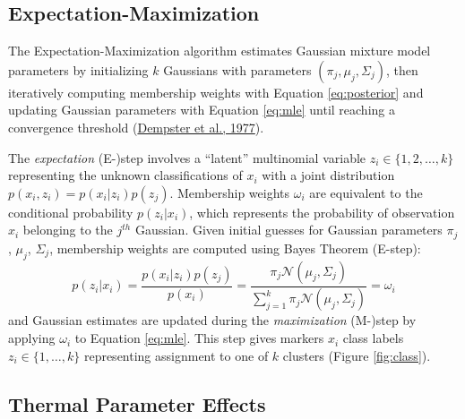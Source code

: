\hypertarget{expectation-maximization}{%
\subsection{Expectation-Maximization}\label{expectation-maximization}}

The Expectation-Maximization algorithm estimates Gaussian mixture model parameters by initializing \(k\) Gaussians with parameters \((\pi_j, \mu_j, \Sigma_j)\), then iteratively computing membership weights with Equation \eqref{eq:posterior} and updating Gaussian parameters with Equation \eqref{eq:mle} until reaching a convergence threshold (\protect\hyperlink{ref-dempster1977}{Dempster et al., 1977}).

The \emph{expectation} (E-)step involves a ``latent'' multinomial variable \(z_{i} \in \{1, 2, \dots, k\}\) representing the unknown classifications of \(x_i\) with a joint distribution \(p(x_i,z_{i}) = p(x_i | z_{i})p(z_{j})\). Membership weights \(\omega_{i}\) are equivalent to the conditional probability \(p(z_{i} | x_i)\), which represents the probability of observation \(x_i\) belonging to the \(j^{th}\) Gaussian. Given initial guesses for Gaussian parameters \(\pi_j\), \(\mu_j\), \(\Sigma_j\), membership weights are computed using Bayes Theorem (E-step):
\begin{equation}
  p(z_{i} | x_i) = \frac{p(x_i | z_{i})p(z_{j})}{p(x_i)} = \frac{\pi_j \mathcal{N}(\mu_j, \Sigma_j)}{\sum_{j=1}^k \pi_j \mathcal{N}(\mu_j, \Sigma_j)} = \omega_{i}
  \label{eq:posterior}
\end{equation}
and Gaussian estimates are updated during the \emph{maximization} (M-)step by applying \(\omega_{i}\) to Equation \eqref{eq:mle}. This step gives markers \(x_i\) class labels \(z_i \in \{1, \dots, k\}\) representing assignment to one of \(k\) clusters (Figure \ref{fig:class}).

\hypertarget{thermal-parameter-effects}{%
\subsection{Thermal Parameter Effects}\label{thermal-parameter-effects}}



